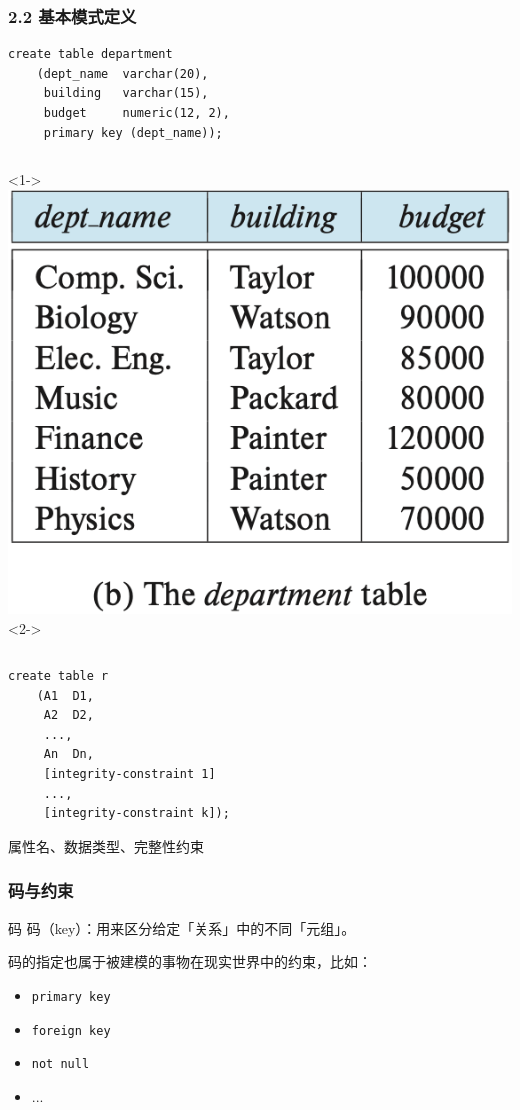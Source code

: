 \documentclass[aspectratio=169, 14pt]{beamer}
\begin{document}
\begin{frame}[fragile]
	\frametitle{2.2 基本模式定义}
	\begin{verbatim}
create table department
    (dept_name  varchar(20),
     building   varchar(15),
     budget     numeric(12, 2),
     primary key (dept_name)); 
    \end{verbatim}

	\begin{columns}
		<1->
		\includegraphics[width=\textwidth,trim={0cm 4cm 0cm 0cm},clip]{table/department}
		<2->
	\end{columns}
\end{frame}

\begin{frame}[fragile]
	\begin{verbatim}
create table r
    (A1  D1,
     A2  D2,
     ...,
     An  Dn,
     [integrity-constraint 1]
     ...,
     [integrity-constraint k]); 
    \end{verbatim}
	属性名、数据类型、完整性约束
\end{frame}

\begin{frame}
	\frametitle{码与约束}
	\begin{block}{码}
		码（key）：用来区分给定「关系」中的不同「元组」。
	\end{block}
	码的指定也属于被建模的事物在现实世界中的\alert{约束}，比如：

	\begin{itemize}
		\item \texttt{primary key}
		\item \texttt{foreign key}
		\item \texttt{not null}
		\item ...
	\end{itemize}

\end{frame}
\end{document}
